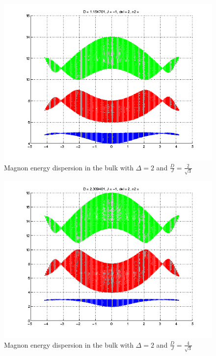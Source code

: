 \begin{figure}
    \centering
    \includegraphics[scale=0.5]{latex_plots/kagome_D_2_sqrt(3).png}
    \caption{Magnon energy dispersion in the bulk with $\Delta =2$ and $\frac{D}{J} = \frac{2}{\sqrt{3}}$}
\end{figure}
\begin{figure}
    \centering
    \includegraphics[scale=0.5]{latex_plots/kagome_D_4_sqrt(3).png}
    \caption{Magnon energy dispersion in the bulk with $\Delta =2$ and $\frac{D}{J} = \frac{4}{\sqrt{3}}$}
\end{figure}
